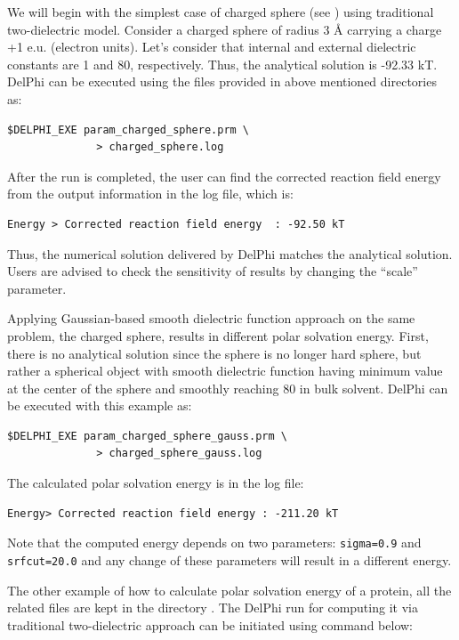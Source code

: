 \documentclass[9pt,tutorial,pubversion]{livecoms}
\newcommand*\ttvar[1]{\texttt{\expandafter\dottvar\detokenize{#1}\relax}}
\newcommand*\dottvar[1]{\ifx\relax#1\else
  \expandafter\ifx\string_#1\string_\allowbreak\else#1\fi
  \expandafter\dottvar\fi}
\begin{document}
We will begin with the simplest case of charged sphere (see \ttvar{Example_3.1.1/Ex1/}) using traditional two-dielectric model. Consider a charged sphere of radius 3 Å carrying a charge +1 e.u. (electron units). Let’s consider that internal and external dielectric constants are 1 and 80, respectively. Thus, the analytical solution is -92.33 kT. DelPhi can be executed using the files provided in above mentioned directories as:

\begin{verbatim}
$DELPHI_EXE param_charged_sphere.prm \
              > charged_sphere.log
\end{verbatim}

After the run is completed, the user can find the corrected reaction field energy from the output information in the log file, which is: 
\begin{verbatim}
Energy > Corrected reaction field energy  : -92.50 kT
\end{verbatim}

Thus, the numerical solution delivered by DelPhi matches the analytical solution. Users are advised to check the sensitivity of results by changing the “scale” parameter. 

Applying Gaussian-based smooth dielectric function approach on the same problem, the charged sphere, results in different polar solvation energy. First, there is no analytical solution since the sphere is no longer hard sphere, but rather a spherical object with smooth dielectric function having minimum value at the center of the sphere and smoothly reaching 80 in bulk solvent. DelPhi can be executed with this example as:

\begin{verbatim}
$DELPHI_EXE param_charged_sphere_gauss.prm \
              > charged_sphere_gauss.log
\end{verbatim}

The calculated polar solvation energy is in the log file:

\begin{verbatim}
Energy> Corrected reaction field energy : -211.20 kT
\end{verbatim}

Note that the computed energy depends on two parameters: \texttt{sigma=0.9} and \texttt{srfcut=20.0} and any change of these parameters will result in a different energy. 

The other example of how to calculate polar solvation energy of a protein, all the related files are kept in the directory \ttvar{Example_3.1.1/Ex2/}. The DelPhi run for computing it via traditional two-dielectric approach can be initiated using command below:
\end{document}
